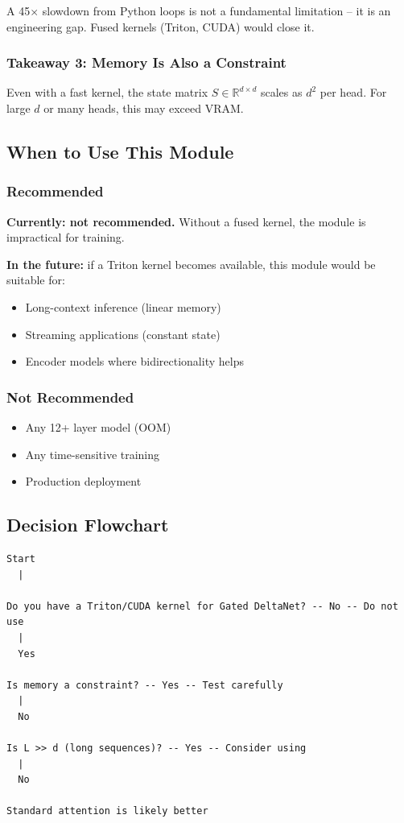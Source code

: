 A 45$\times$ slowdown from Python loops is not a fundamental limitation -- it is 
an engineering gap. Fused kernels (Triton, CUDA) would close it.

\subsubsection{Takeaway 3: Memory Is Also a Constraint}

Even with a fast kernel, the state matrix $S \in \mathbb{R}^{d \times d}$ 
scales as $d^2$ per head. For large $d$ or many heads, this may exceed 
VRAM.

\subsection{When to Use This Module}

\subsubsection{Recommended}

\textbf{Currently: not recommended.} Without a fused kernel, the module is 
impractical for training.

\textbf{In the future:} if a Triton kernel becomes available, this module 
would be suitable for:
\begin{itemize}
\item Long-context inference (linear memory)
\item Streaming applications (constant state)
\item Encoder models where bidirectionality helps

\end{itemize}
\subsubsection{Not Recommended}

\begin{itemize}
\item Any 12+ layer model (OOM)
\item Any time-sensitive training
\item Production deployment

\end{itemize}
\subsection{Decision Flowchart}

\begin{lstlisting}
Start
  |
   
Do you have a Triton/CUDA kernel for Gated DeltaNet? -- No -- Do not use
  |
  Yes
   
Is memory a constraint? -- Yes -- Test carefully
  |
  No
   
Is L >> d (long sequences)? -- Yes -- Consider using
  |
  No
   
Standard attention is likely better
\end{lstlisting}

